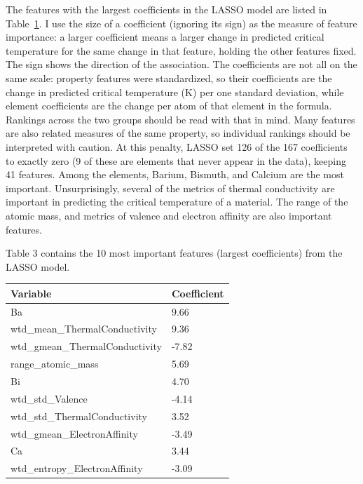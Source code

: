 \documentclass{article}
\begin{document}
The features with the largest coefficients in the LASSO model are listed in Table~\ref{table:lasso_coefficients}. I use the size of a coefficient (ignoring its sign) as the measure of feature importance: a larger coefficient means a larger change in predicted critical temperature for the same change in that feature, holding the other features fixed. The sign shows the direction of the association. The coefficients are not all on the same scale: property features were standardized, so their coefficients are the change in predicted critical temperature (K) per one standard deviation, while element coefficients are the change per atom of that element in the formula. Rankings across the two groups should be read with that in mind. Many features are also related measures of the same property, so individual rankings should be interpreted with caution. At this penalty, LASSO set 126 of the 167 coefficients to exactly zero (9 of these are elements that never appear in the data), keeping 41 features. Among the elements, Barium, Bismuth, and Calcium are the most important. Unsurprisingly, several of the metrics of thermal conductivity are important in predicting the critical temperature of a material. The range of the atomic mass, and metrics of valence and electron affinity are also important features.

\FloatBarrier
Table 3 contains the 10 most important features (largest coefficients) from the LASSO model.

\begin{table}[h!]
    \centering
    \begin{tabular}{|l|l|}
    \hline
    \textbf{Variable} & \textbf{Coefficient} \\ \hline \hline
    Ba & 9.66 \\ \hline
    wtd\_mean\_ThermalConductivity & 9.36 \\ \hline
    wtd\_gmean\_ThermalConductivity & -7.82 \\ \hline
    range\_atomic\_mass & 5.69 \\ \hline
    Bi & 4.70 \\ \hline
    wtd\_std\_Valence & -4.14 \\ \hline
    wtd\_std\_ThermalConductivity & 3.52 \\ \hline
    wtd\_gmean\_ElectronAffinity & -3.49 \\ \hline
    Ca & 3.44 \\ \hline
    wtd\_entropy\_ElectronAffinity & -3.09 \\ \hline
    \end{tabular}
    \label{table:lasso_coefficients}
\end{table}
\end{document}
